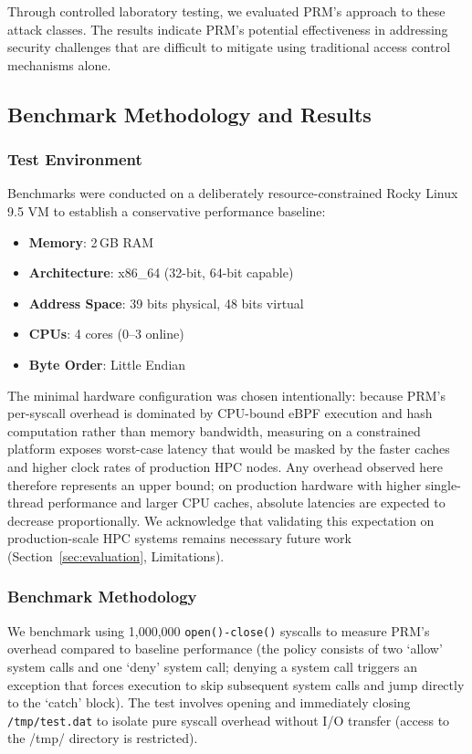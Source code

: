 \documentclass[]{sn-jnl}
\begin{document}
Through controlled laboratory testing, we evaluated PRM's approach to these
attack classes. The results indicate PRM's potential effectiveness in addressing
security challenges that are difficult to mitigate using traditional access
control mechanisms alone.

\subsection{Benchmark Methodology and Results}

\subsubsection{Test Environment}

Benchmarks were conducted on a deliberately resource-constrained Rocky Linux 9.5
VM to establish a conservative performance baseline:
\begin{itemize}
\item \textbf{Memory}: 2\,GB RAM
\item \textbf{Architecture}: x86\_64 (32-bit, 64-bit capable)
\item \textbf{Address Space}: 39 bits physical, 48 bits virtual
\item \textbf{CPUs}: 4 cores (0--3 online)
\item \textbf{Byte Order}: Little Endian
\end{itemize}

The minimal hardware configuration was chosen intentionally: because PRM's
per-syscall overhead is dominated by CPU-bound eBPF execution and hash
computation rather than memory bandwidth, measuring on a constrained platform
exposes worst-case latency that would be masked by the faster caches and higher
clock rates of production HPC nodes. Any overhead observed here therefore
represents an upper bound; on production hardware with higher single-thread
performance and larger CPU caches, absolute latencies are expected to decrease
proportionally. We acknowledge that validating this expectation on
production-scale HPC systems remains necessary future work
(Section~\ref{sec:evaluation}, Limitations).

\subsubsection{Benchmark Methodology}

We benchmark using 1,000,000 \texttt{open()-close()} syscalls to measure PRM's
overhead compared to baseline performance (the policy consists of two `allow'
system calls and one `deny' system call; denying a system call triggers an
exception that forces execution to skip subsequent system calls and jump directly
to the `catch' block). The test involves opening and immediately closing
\texttt{/tmp/test.dat} to isolate pure syscall overhead without I/O transfer
(access to the /tmp/ directory is restricted).
\end{document}
